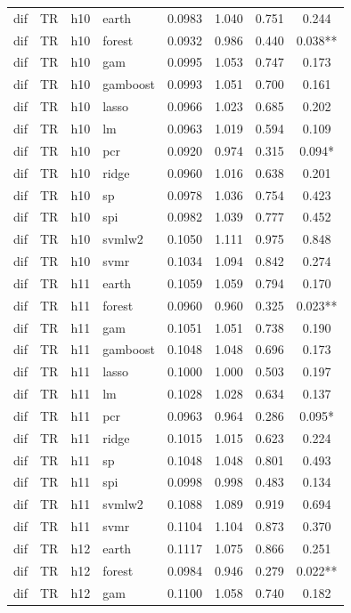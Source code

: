 \begin{ThreePartTable}
\begin{longtable}[t]{llclcccc}
\addlinespace
dif & TR & h10 & earth & 0.0983 & 1.040 & 0.751 & 0.244\\
dif & TR & h10 & forest & 0.0932 & 0.986 & 0.440 & 0.038**\\
dif & TR & h10 & gam & 0.0995 & 1.053 & 0.747 & 0.173\\
dif & TR & h10 & gamboost & 0.0993 & 1.051 & 0.700 & 0.161\\
dif & TR & h10 & lasso & 0.0966 & 1.023 & 0.685 & 0.202\\
dif & TR & h10 & lm & 0.0963 & 1.019 & 0.594 & 0.109\\
dif & TR & h10 & pcr & 0.0920 & 0.974 & 0.315 & 0.094*\\
dif & TR & h10 & ridge & 0.0960 & 1.016 & 0.638 & 0.201\\
dif & TR & h10 & sp & 0.0978 & 1.036 & 0.754 & 0.423\\
dif & TR & h10 & spi & 0.0982 & 1.039 & 0.777 & 0.452\\
dif & TR & h10 & svmlw2 & 0.1050 & 1.111 & 0.975 & 0.848\\
dif & TR & h10 & svmr & 0.1034 & 1.094 & 0.842 & 0.274\\
\addlinespace
dif & TR & h11 & earth & 0.1059 & 1.059 & 0.794 & 0.170\\
dif & TR & h11 & forest & 0.0960 & 0.960 & 0.325 & 0.023**\\
dif & TR & h11 & gam & 0.1051 & 1.051 & 0.738 & 0.190\\
dif & TR & h11 & gamboost & 0.1048 & 1.048 & 0.696 & 0.173\\
dif & TR & h11 & lasso & 0.1000 & 1.000 & 0.503 & 0.197\\
dif & TR & h11 & lm & 0.1028 & 1.028 & 0.634 & 0.137\\
dif & TR & h11 & pcr & 0.0963 & 0.964 & 0.286 & 0.095*\\
dif & TR & h11 & ridge & 0.1015 & 1.015 & 0.623 & 0.224\\
dif & TR & h11 & sp & 0.1048 & 1.048 & 0.801 & 0.493\\
dif & TR & h11 & spi & 0.0998 & 0.998 & 0.483 & 0.134\\
dif & TR & h11 & svmlw2 & 0.1088 & 1.089 & 0.919 & 0.694\\
dif & TR & h11 & svmr & 0.1104 & 1.104 & 0.873 & 0.370\\
\addlinespace
dif & TR & h12 & earth & 0.1117 & 1.075 & 0.866 & 0.251\\
dif & TR & h12 & forest & 0.0984 & 0.946 & 0.279 & 0.022**\\
dif & TR & h12 & gam & 0.1100 & 1.058 & 0.740 & 0.182\\

\end{longtable}
\end{ThreePartTable}
